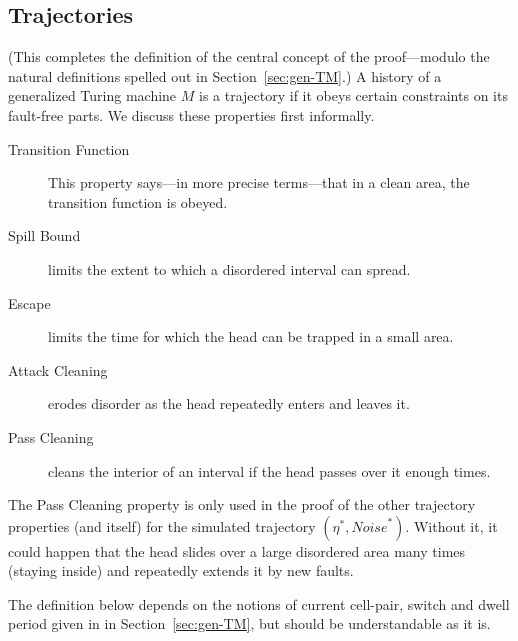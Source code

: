\documentclass[11pt]{memoir}
\theoremstyle{definition} %
\newcommand{\Noise}{\mathit{Noise}}
\begin{document}
\subsection{Trajectories}\label{sec:traj}

(This completes the definition of the central concept of the
proof---modulo the natural definitions spelled out in Section~\ref{sec:gen-TM}.)
A history of a generalized Turing machine \( M \) is a trajectory
if it obeys certain constraints on its fault-free parts.
We discuss these properties first informally.

\begin{description}
\item[Transition Function] This property says---in more precise terms---that
  in a clean area, the transition function is obeyed.

\item[Spill Bound] limits the extent to which a disordered interval can spread.

\item[Escape] limits the time for which the head can be trapped in a small area.

\item[Attack Cleaning] erodes disorder as the head repeatedly enters and leaves it.

\item[Pass Cleaning] cleans the interior of an
  interval if the head passes over it enough times.
  
\end{description}

\begin{remark}
The Pass Cleaning property is only used in the proof of the other trajectory properties
(and itself) for the simulated trajectory \( (\eta^{*},\Noise^{*}) \).
Without it, it could happen that
the head slides over a large disordered area many times (staying inside) and repeatedly
extends it by new faults.  
\end{remark}

The definition below depends on the notions of current cell-pair, switch and dwell period given in
 in Section~\ref{sec:gen-TM}, but should be understandable as it is.
\end{document}
